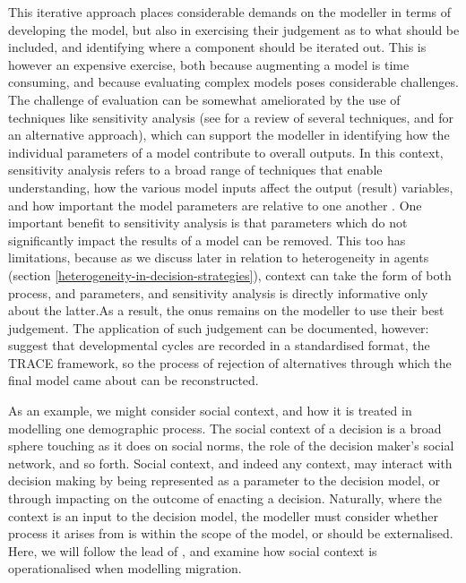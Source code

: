 \documentclass{article}
\begin{document}
This iterative approach places considerable demands on the modeller in terms of developing the model, but also in exercising their judgement as to what should be included, and identifying where a component should be iterated out. This is however an expensive exercise, both because augmenting a model is time consuming, and because evaluating complex models poses considerable challenges. The challenge of evaluation can be somewhat ameliorated by the use of techniques like sensitivity analysis (see \citet{Thiele2014} for a review of several techniques, and \citet{Oakley2004} for an alternative approach), which can support the modeller in identifying how the individual parameters of a model contribute to overall outputs. In this context, sensitivity analysis refers to a broad range of techniques that enable understanding, how the various model inputs affect the output (result) variables, and how important the model parameters are relative to one another \citep{Oakley2004, Thiele2014}. One important benefit to sensitivity analysis is that parameters which do not significantly impact the results of a model can be removed. This too has limitations, because as we discuss later in relation to heterogeneity in agents (section \ref{heterogeneity-in-decision-strategies}), context can take the form of both process, and parameters, and sensitivity analysis is directly informative only about the latter.As a result, the onus remains on the modeller to use their best judgement. The application of such judgement can be documented, however: \cite{Schmolke2010} suggest that developmental cycles are recorded in a standardised format, the TRACE framework, so the process of rejection of alternatives through which the final model came about can be reconstructed.

As an example, we might consider social context, and how it is treated in modelling one demographic process. The social context of a decision is a broad sphere touching as it does on social norms, the role of the decision maker's social network, and so forth. Social context, and indeed any context, may interact with decision making by being represented as a parameter to the decision model, or through impacting on the outcome of enacting a decision. Naturally, where the context is an input to the decision model, the modeller must consider whether process it arises from is within the scope of the model, or should be externalised.
Here, we will follow the lead of \citet{Klabunde}, and examine how social context is operationalised when modelling migration. 
\end{document}
